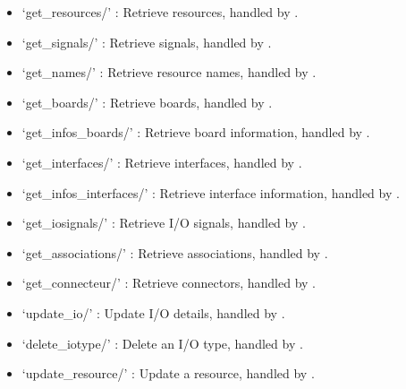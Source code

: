 \documentclass[letterpaper,10pt,english]{sphinxmanual}
\begin{document}
\begin{description}
\begin{itemize}
\item {} 
\sphinxAtStartPar
‘get\_resources/’ : Retrieve resources, handled by .

\item {} 
\sphinxAtStartPar
‘get\_signals/’ : Retrieve signals, handled by .

\item {} 
\sphinxAtStartPar
‘get\_names/’ : Retrieve resource names, handled by .

\item {} 
\sphinxAtStartPar
‘get\_boards/’ : Retrieve boards, handled by .

\item {} 
\sphinxAtStartPar
‘get\_infos\_boards/’ : Retrieve board information, handled by .

\item {} 
\sphinxAtStartPar
‘get\_interfaces/’ : Retrieve interfaces, handled by .

\item {} 
\sphinxAtStartPar
‘get\_infos\_interfaces/’ : Retrieve interface information, handled by .

\item {} 
\sphinxAtStartPar
‘get\_iosignals/’ : Retrieve I/O signals, handled by .

\item {} 
\sphinxAtStartPar
‘get\_associations/’ : Retrieve associations, handled by .

\item {} 
\sphinxAtStartPar
‘get\_connecteur/’ : Retrieve connectors, handled by .

\item {} 
\sphinxAtStartPar
‘update\_io/’ : Update I/O details, handled by .

\item {} 
\sphinxAtStartPar
‘delete\_iotype/’ : Delete an I/O type, handled by .

\item {} 
\sphinxAtStartPar
‘update\_resource/’ : Update a resource, handled by .


\end{itemize}
\end{description}
\end{document}
